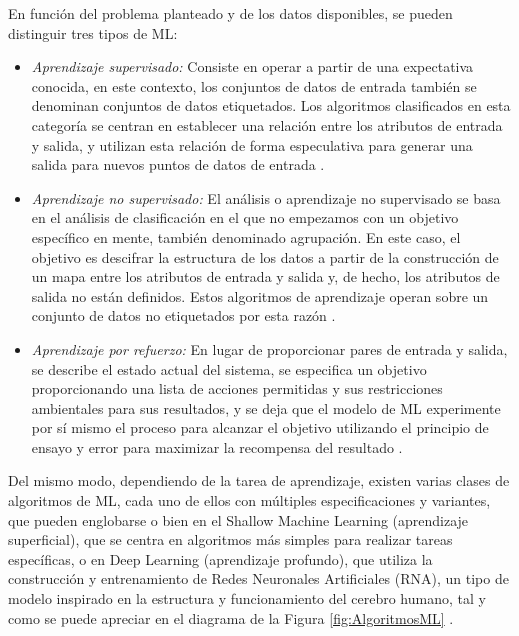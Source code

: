 En función del problema planteado y de los datos disponibles, se pueden distinguir tres tipos de ML:

\begin{itemize}
 \item \textit{Aprendizaje supervisado:} Consiste en operar a partir de una expectativa conocida, en este contexto, los conjuntos de datos de entrada también se denominan conjuntos de datos etiquetados. Los algoritmos clasificados en esta categoría se centran en establecer una relación entre los atributos de entrada y salida, y utilizan esta relación de forma especulativa para generar una salida para nuevos puntos de datos de entrada \cite{Gollapudi16}. 
 
 \item \textit{Aprendizaje no supervisado:} El análisis o aprendizaje no supervisado se basa en el análisis de clasificación en el que no empezamos con un objetivo específico en mente, también denominado agrupación. En este caso, el objetivo es descifrar la estructura de los datos a partir de la construcción de un mapa entre los atributos de entrada y salida y, de hecho, los atributos de salida no están definidos. Estos algoritmos de aprendizaje operan sobre un conjunto de datos no etiquetados por esta razón \cite{Gollapudi16}.
 
 \item \textit{Aprendizaje por refuerzo:} En lugar de proporcionar pares de entrada y salida, se describe el estado actual del sistema, se especifica un objetivo proporcionando una lista de acciones permitidas y sus restricciones ambientales para sus resultados, y se deja que el modelo de ML experimente por sí mismo el proceso para alcanzar el objetivo utilizando el principio de ensayo y error para maximizar la recompensa del resultado \cite{Janiesch21}.
 
\end{itemize}

Del mismo modo, dependiendo de la tarea de aprendizaje, existen varias clases de algoritmos de ML, cada uno de ellos con múltiples especificaciones y variantes, que pueden englobarse o bien en el Shallow Machine Learning (aprendizaje superficial), que se centra en algoritmos más simples para realizar tareas específicas, o en Deep Learning (aprendizaje profundo), que utiliza la construcción y entrenamiento de Redes Neuronales Artificiales (RNA), un tipo de modelo inspirado en la estructura y funcionamiento del cerebro humano, tal y como se puede apreciar en el diagrama de la Figura \ref{fig:AlgoritmosML} \cite{Janiesch21}. \\

